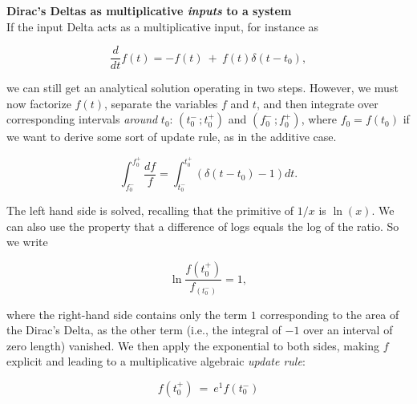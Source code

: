 \begin{svgraybox}
	{\bf{Dirac's Deltas as multiplicative \textit{inputs} to a system}}
	\\

	If the input Delta acts as a multiplicative input, for instance as  

	\begin{equation}
		\frac{d}{dt}f(t) = - f(t)\ +\ f(t) \delta(t - t_0),
	\end{equation}

	we can still get an analytical solution operating in two steps. However, we must now factorize \(f(t)\), separate the variables \(f\) and \(t\), and then integrate over corresponding intervals \textit{around} \(t_0\):  \( (t_0^ -\,  ; t_0^+ ) \) and \( (f_0^ -\,  ; f_0^+ ) \), where \(f_0 = f(t_0)\) if we want to derive some sort of update rule, as in the additive case. 
	
	\begin{equation}
		\int_{f_0^-}^{f_0^+} \frac{df}{f} = \int_{t_0^ -}^{t_0^+} (\delta(t - t_0) - 1)dt.
	\end{equation}

	The left hand side is solved, recalling that the primitive of \(1/x\) is \(\ln(x)\). We can also use the property that a difference of logs equals the log of the ratio. So we write 

	\begin{equation}
		\ln \frac{f(t_0^+)}{f_(t_0^-)} = 1,
	\end{equation}

	where the right-hand side contains only the term \(1 \) corresponding to the area of the Dirac's Delta, as the other term (i.e., the integral of \( -1\) over an interval of zero length) vanished. We then apply the exponential to both sides, making \(f\) explicit and leading to a multiplicative algebraic \textit{update rule}:
	
	\begin{equation}
		f(t_0^+)\ =\ e^{1} f(t_0^-)
	\end{equation}

\end{svgraybox}
